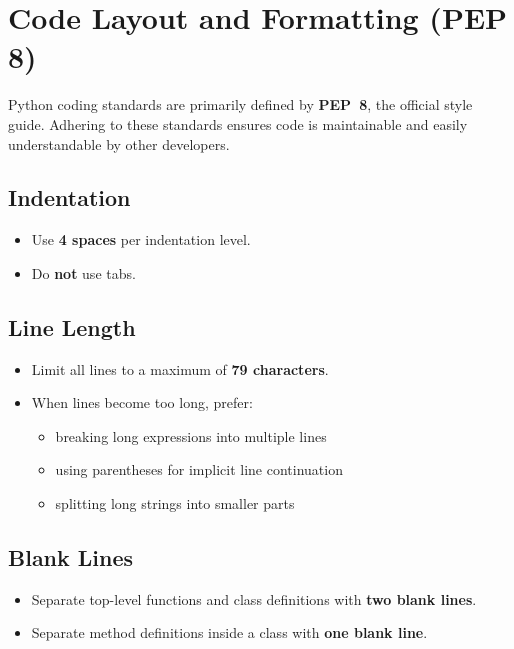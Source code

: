 \documentclass[11pt]{article}
\begin{document}
\section{Code Layout and Formatting (PEP 8)}

Python coding standards are primarily defined by \textbf{PEP~8}, the official style guide. Adhering to these standards ensures code is maintainable and easily understandable by other developers.

\subsection{Indentation}
\begin{itemize}[label={-},leftmargin=2em,labelsep=0.6em,itemsep=0.2em]
  \item Use \textbf{4 spaces} per indentation level.
  \item Do \textbf{not} use tabs.
\end{itemize}

\subsection{Line Length}
\begin{itemize}[label={-},leftmargin=2em,labelsep=0.6em,itemsep=0.2em]
  \item Limit all lines to a maximum of \textbf{79 characters}.
  \item When lines become too long, prefer:
  \begin{itemize}[label={-},leftmargin=2em,labelsep=0.6em,itemsep=0.15em]
    \item breaking long expressions into multiple lines
    \item using parentheses for implicit line continuation
    \item splitting long strings into smaller parts
  \end{itemize}
\end{itemize}

\subsection{Blank Lines}
\begin{itemize}[label={-},leftmargin=2em,labelsep=0.6em,itemsep=0.2em]
  \item Separate top-level functions and class definitions with \textbf{two blank lines}.
  \item Separate method definitions inside a class with \textbf{one blank line}.
\end{itemize}
\end{document}
